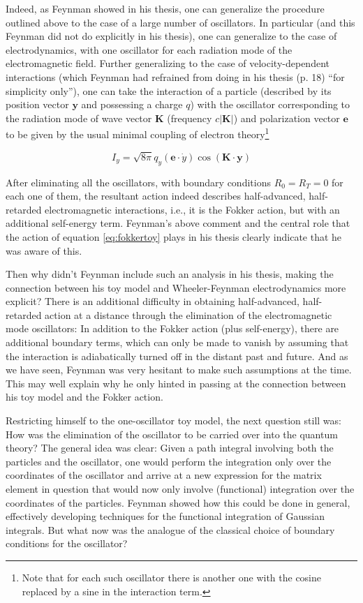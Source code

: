 \documentclass[12pt]{article}
\begin{document}
Indeed, as Feynman showed in his thesis, one can generalize the procedure outlined above to the case of a large number of oscillators. In particular (and this Feynman did not do explicitly in his thesis), one can generalize to the case of electrodynamics, with one oscillator for each radiation mode of the electromagnetic field. Further generalizing to the case of velocity-dependent interactions (which Feynman had refrained from doing in his thesis (p. 18) ``for simplicity only''), one can take the interaction of a particle (described by its position vector $\mathbf{y}$ and possessing a charge $q$) with the oscillator corresponding to the radiation mode of wave vector $\mathbf{K}$ (frequency $c \vert \mathbf{K} \vert$) and polarization vector $\mathbf{e}$ to be given by the usual minimal coupling of electron theory\footnote{Note that for each such oscillator there is another one with the cosine replaced by a sine in the interaction term.}

\begin{equation}
I_y = \sqrt{8 \pi} q_y \left( \mathbf{e} \cdot \dot{y} \right) \cos{\left( \mathbf{K} \cdot  \mathbf{y} \right)}
\end{equation}

After eliminating all the oscillators, with boundary conditions $R_0= R_T=0$ for each one of them, the resultant action indeed describes half-advanced, half-retarded electromagnetic interactions, i.e., it is the Fokker action, but with an additional self-energy term. Feynman's above comment and the central role that the action of equation \ref{eq:fokkertoy} plays in his thesis clearly indicate that he was aware of this.

Then why didn't Feynman include such an analysis in his thesis, making the connection between his toy model and Wheeler-Feynman electrodynamics more explicit? There is an additional difficulty in obtaining half-advanced, half-retarded action at a distance through the elimination of the electromagnetic mode oscillators: In addition to the Fokker action (plus self-energy), there are additional boundary terms, which can only be made to vanish by assuming that the interaction is adiabatically turned off in the distant past and future. And as we have seen, Feynman was very hesitant to make such assumptions at the time. This may well explain why he only hinted in passing at the connection between his toy model and the Fokker action.

Restricting himself to the one-oscillator toy model, the next question still was: How was the elimination of the oscillator to be carried over into the quantum theory? The general idea was clear: Given a path integral involving both the particles and the oscillator, one would perform the integration only over the coordinates of the oscillator and arrive at a new expression for the matrix element in question that would now only involve (functional) integration over the coordinates of the particles. Feynman showed how this could be done in general, effectively developing techniques for the functional integration of Gaussian integrals. But what now was the analogue of the classical choice of boundary conditions for the oscillator?
\end{document}
